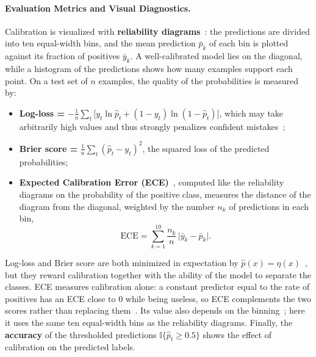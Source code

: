 \documentclass[a4paper, 10pt]{article}
\begin{document}
\paragraph{Evaluation Metrics and Visual Diagnostics.}
Calibration is visualized with \textbf{reliability diagrams}~\cite{niculescu2005predicting}: the predictions are divided into ten equal-width bins, and the mean prediction $\bar{p}_k$ of each bin is plotted against its fraction of positives $\bar{y}_k$. A well-calibrated model lies on the diagonal, while a histogram of the predictions shows how many examples support each point. On a test set of $n$ examples, the quality of the probabilities is measured by:
\begin{itemize}
    \item \textbf{Log-loss =} $-\frac{1}{n}\sum_{t} \big[y_t \ln \hat{p}_t + (1 - y_t) \ln(1 - \hat{p}_t)\big]$, which may take arbitrarily high values and thus strongly penalizes confident mistakes~\cite{cesabianchi2026notes};
    \item \textbf{Brier score = } $\frac{1}{n}\sum_{t} (\hat{p}_t - y_t)^2$, the squared loss of the predicted probabilities;
    \item \textbf{Expected Calibration Error (ECE)}~\cite{naeini2015obtaining, pavlovic2025understanding}, computed like the reliability diagrams on the probability of the positive class, measures the distance of the diagram from the diagonal, weighted by the number $n_k$ of predictions in each bin,
    \begin{equation}\label{eq:ece}
        \mathrm{ECE} = \sum_{k=1}^{10} \frac{n_k}{n}\,\big|\bar{y}_k - \bar{p}_k\big|.
    \end{equation}
\end{itemize}

Log-loss and Brier score are both minimized in expectation by $\hat{p}(x) = \eta(x)$~\cite{cesabianchi2026notes}, but they reward calibration together with the ability of the model to separate the classes. ECE measures calibration alone: a constant predictor equal to the rate of positives has an ECE close to $0$ while being useless, so ECE complements the two scores rather than replacing them~\cite{pavlovic2025understanding}. Its value also depends on the binning~\cite{pavlovic2025understanding}; here it uses the same ten equal-width bins as the reliability diagrams. Finally, the \textbf{accuracy} of the thresholded predictions $\mathbb{I}\{\hat{p}_t \ge 0.5\}$ shows the effect of calibration on the predicted labels.
\end{document}
